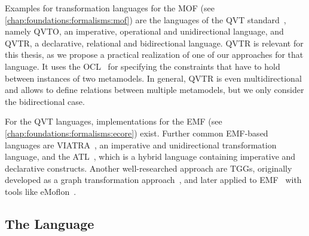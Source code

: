 Examples for transformation languages for the \gls{MOF} (see \autoref{chap:foundations:formalisms:mof}) are the languages of the \gls{QVT} standard~\cite{qvt}, namely \gls{QVTO}, an imperative, operational and unidirectional language, and \gls{QVTR}, a declarative, relational and bidirectional language.
\gls{QVTR} is relevant for this thesis, as we propose a practical realization of one of our approaches for that language.
It uses the \gls{OCL}~\cite{ocl} for specifying the constraints that have to hold between instances of two metamodels.
In general, \gls{QVTR} is even multidirectional and allows to define relations between multiple metamodels, but we only consider the bidirectional case.

For the \gls{QVT} languages, implementations for the \gls{EMF} (see \autoref{chap:foundations:formalisms:ecore}) exist. Further common \gls{EMF}-based languages are \gls{VIATRA}~\cite{bergmann2015viatra-ICMT}, an imperative and unidirectional transformation language, and the \gls{ATL}~\cite{jouault2006a,martinez2017incrementalATL-SCP}, which is a hybrid language containing imperative and declarative constructs.
Another well-researched approach are \glspl{TGG}, originally developed as a graph transformation approach~\cite{schuerr1995a}, and later applied to \gls{EMF}~\cite{leblebici2014IncrementalTGGSurvey-GTVMT} with tools like eMoflon~\cite{anjorin2014diss}.





\subsection{The \reactions Language}
\label{chap:foundations:transformations:reactions}

